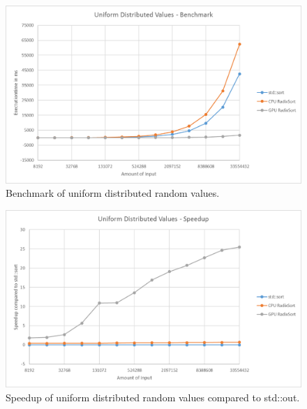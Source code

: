 \documentclass{llncs}
\begin{document}
\begin{figure}
  \begin{center}
    \includegraphics[width=\columnwidth]{charts/uniform_benchmark.png}
  \end{center}
  \caption{Benchmark of uniform distributed random values.}\label{fig:uniform_bench}
\end{figure}

\begin{figure}
  \begin{center}
    \includegraphics[width=\columnwidth]{charts/uniform_speedup.png}
  \end{center}
  \caption{Speedup of uniform distributed random values compared to std::out.}\label{fig:uniform_speedup}
\end{figure}
\end{document}
